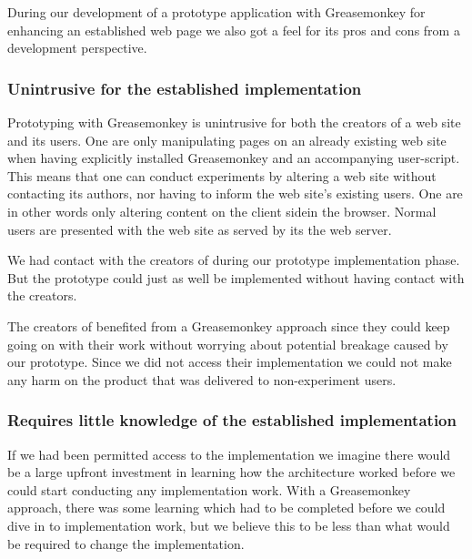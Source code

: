 \parabreak

During our development of a prototype application with Greasemonkey for
enhancing an established web page we also got a feel for its pros and cons
from a development perspective.

\subsubsection{Unintrusive for the established implementation}

Prototyping with Greasemonkey is unintrusive for both the creators
of a web site and its users.  One are only manipulating
pages on an already existing web site when having explicitly installed
Greasemonkey and an accompanying user-script. This means that one can
conduct experiments by altering a web site without contacting its authors,
nor having to inform the web site's existing users. One are in other words
only altering content on the client side\dash{}in the browser. Normal users
are presented with the web site as served by its the web server.

We had contact with the creators of \urort{} during our prototype
implementation phase. But the prototype could just as well be implemented
without having contact with the creators.%

The creators of \urort{} benefited from a Greasemonkey approach since they
could keep going on with their work without worrying about potential breakage
caused by our prototype. Since we did not access their implementation we could
not make any harm on the product that was delivered to non-experiment users.

\subsubsection{Requires little knowledge of the established implementation}

If we had been permitted access to the \urort{} implementation we imagine
there would be a large upfront investment in learning how the \urort{}
architecture worked before we could start conducting any implementation work.
With a Greasemonkey approach, there was some learning which had to be
completed before we could dive in to implementation work, but we believe this
to be less than what would be required to change the \urort{} implementation.

